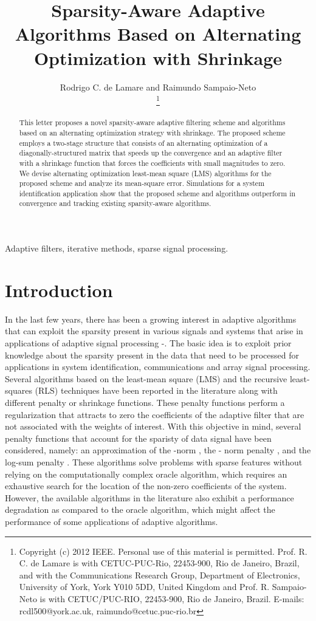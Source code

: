 \documentclass[10pt,onecolumn]{IEEEtran}
\title{Sparsity-Aware Adaptive Algorithms Based on Alternating Optimization with Shrinkage }
\author{Rodrigo C. de Lamare and Raimundo Sampaio-Neto  \vspace{-0.25em} \\
\thanks{Copyright (c) 2012 IEEE. Personal use of this material is permitted.
Prof. R. C. de Lamare is with CETUC-PUC-Rio, 22453-900, Rio de Janeiro,
Brazil, and with the Communications Research Group, Department of
Electronics, University of York, York Y010 5DD, United Kingdom and
Prof. R. Sampaio-Neto is with CETUC/PUC-RIO, 22453-900, Rio de
Janeiro, Brazil. E-mails: rcdl500@york.ac.uk,
raimundo@cetuc.puc-rio.br} }
\begin{document}
\maketitle

\begin{abstract}
This letter proposes a novel sparsity-aware adaptive filtering
scheme and algorithms based on an alternating optimization strategy
with shrinkage. The proposed scheme employs a two-stage structure
that consists of an alternating optimization of a
diagonally-structured matrix that speeds up the convergence and an
adaptive filter with a shrinkage function that forces the
coefficients with small magnitudes to zero. We devise alternating
optimization least-mean square (LMS) algorithms for the proposed
scheme and analyze its mean-square error. Simulations for a system
identification application show that the proposed scheme and
algorithms outperform in convergence and tracking existing
sparsity-aware algorithms.

\end{abstract}
\begin{keywords}
{Adaptive filters, iterative methods, sparse signal processing.}
\end{keywords}


\section{Introduction}

In the last few years, there has been a growing interest in adaptive
algorithms that can exploit the sparsity present in various signals
and systems that arise in applications of adaptive signal processing
\cite{gu}-\cite{jidf}. The basic idea is to exploit prior knowledge
about the sparsity present in the data that need to be processed for
applications in system identification, communications and array
signal processing. Several algorithms based on the least-mean square
(LMS) \cite{gu,chen} and the recursive least-squares (RLS)
\cite{babadi,angelosante,eksioglu,eksioglu2} techniques have been
reported in the literature along with different penalty or shrinkage
functions. These penalty functions perform a regularization that
attracts to zero the coefficients of the adaptive filter that are
not associated with the weights of interest. With this objective in
mind, several penalty functions that account for the sparisty of
data signal have been considered, namely: {an approximation of the
-norm \cite{gu,eksioglu2}, the - norm penalty
\cite{chen,eksioglu}, and the log-sum penalty
\cite{chen,eksioglu,candes}}. These algorithms solve problems with
sparse features without relying on the computationally complex
oracle algorithm, which requires an exhaustive search for the
location of the non-zero coefficients of the system. However, the
available algorithms in the literature also exhibit a performance
degradation as compared to the oracle algorithm, which might affect
the performance of some applications of adaptive algorithms.
\end{document}

